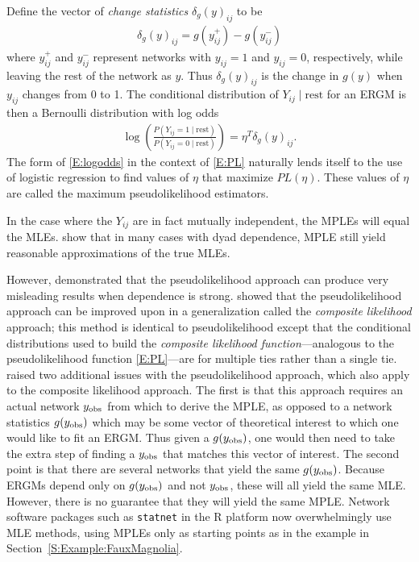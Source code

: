 Define the vector of \textit{change statistics} $\delta_g(y)_{ij}$ to be
\begin{align*}
	\delta_g(y)_{ij} = g(y_{ij}^+) - g(y_{ij}^-)
\end{align*}
where $y_{ij}^+$ and $y_{ij}^-$ represent networks with $y_{ij} = 1$ and $y_{ij} = 0$, 
respectively, while leaving the rest of the network as $y$.  Thus $\delta_g(y)_{ij}$ 
is the change in $g(y)$ when $y_{ij}$ changes from 0 to 1.
The conditional distribution of $Y_{ij} \mid \textrm{rest}$ for an ERGM is then a Bernoulli 
distribution with log odds
\begin{align}
	\log \left ( \frac{P( Y_{ij} =1 \mid \textrm{rest} ) }
				 	 { P( Y_{ij} =0 \mid \textrm{rest} ) } \right ) 
					 			= \eta^T \delta_g(y)_{ij}. \label{E:logodds}
\end{align}
The form of \eqref{E:logodds} in the context of \eqref{E:PL} naturally lends
itself to the use of logistic regression to find values of $\eta$ that
maximize $PL(\eta)$.  These values of $\eta$ are called the maximum pseudolikelihood estimators.

In the case where the $Y_{ij}$ are in fact mutually independent, the MPLEs will equal the MLEs.  
\citet{Strauss:1990} show that in 
many cases with dyad dependence, MPLE still yield reasonable approximations of the 
true MLEs.  

However, \citet*{Geyer:1992, Snijders:2002, introp*, Duijn:2009} demonstrated that 
the pseudolikelihood approach can produce very misleading results 
when dependence is strong.  
\citet*{Composite} showed that the pseudolikelihood approach can be 
improved upon in a generalization 
called the \emph{composite likelihood} approach; this method is identical
to pseudolikelihood except that the conditional distributions used to build the \emph{composite likelihood function}---analogous to the pseudolikelihood function \eqref{E:PL}---are for multiple 
ties rather than a single tie.
\citet{Hummel} raised two additional issues with the pseudolikelihood approach, 
which also apply to the composite likelihood approach. 
The first is that this approach requires
an actual network $y_{\text{obs}}$ from which to derive the MPLE, as opposed to a network
statistics $g(y_{\text{obs}})$ which may be some vector of theoretical interest to 
which one would like to fit an ERGM.  Thus given a $g(y_{\text{obs}})$, one would then
need to take the extra step of finding a $y_{\text{obs}}$ that matches this vector of
interest.  The second point is that there are several networks that
yield the same $g(y_{\text{obs}})$.  Because ERGMs depend only on $g(y_{\text{obs}})$ and not $y_{\text{obs}}$,
these will all yield the same MLE.  However, there is no guarantee that they will yield the same MPLE.
Network software packages such as \texttt{statnet} \citep*{statnet:R} in the R 
platform now overwhelmingly use MLE methods, using MPLEs only as starting points
as in the example in Section~\ref{S:Example:FauxMagnolia}.


